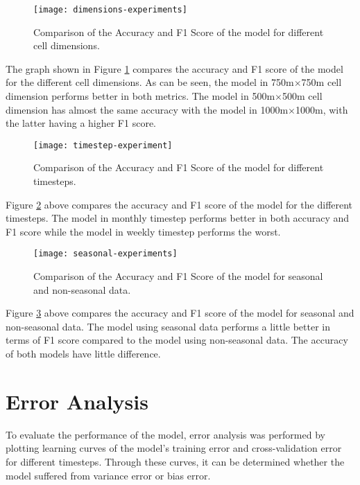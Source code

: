     \begin{figure}[H]
    \centering
    \texttt{[image: dimensions-experiments]}
    \caption{Comparison of the Accuracy and F1 Score of the model for different cell dimensions.}
    \label{fig:dimension-experiments}
    \end{figure}
    The graph shown in Figure \ref{fig:dimension-experiments} compares the accuracy and F1 score of the model for the different cell dimensions. As can be seen, the model in 750m\(\times\)750m cell dimension performs better in both metrics. The model in 500m\(\times\)500m cell dimension has almost the same accuracy with the model in 1000m\(\times\)1000m, with the latter having a higher F1 score.

    \begin{figure}[H]
    \centering
    \texttt{[image: timestep-experiment]}
    \caption{Comparison of the Accuracy and F1 Score of the model for different timesteps.}
    \label{fig:timestep-experiments}
    \end{figure}
    Figure \ref{fig:timestep-experiments} above compares the accuracy and F1 score of the model for the different timesteps. The model in monthly timestep performs better in both accuracy and F1 score while the model in weekly timestep performs the worst.
    
    \begin{figure}[H]
    \centering
    \texttt{[image: seasonal-experiments]}
    \caption{Comparison of the Accuracy and F1 Score of the model for seasonal and non-seasonal data.}
    \label{fig:seasonal-experiments}
    \end{figure}
    Figure \ref{fig:seasonal-experiments} above compares the accuracy and F1 score of the model for seasonal and non-seasonal data. The model using seasonal data performs a little better in terms of F1 score compared to the model using non-seasonal data. The accuracy of both models have little difference.

\section{Error Analysis}
    To evaluate the performance of the model, error analysis was performed by plotting learning curves of the model's training error and cross-validation error for different timesteps. Through these curves, it can be determined whether the model suffered from variance error or bias error.

